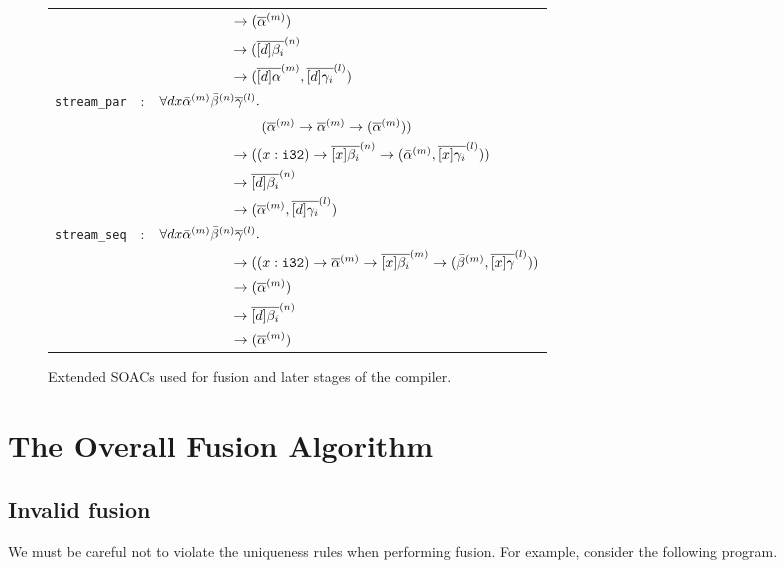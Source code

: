 \begin{figure}[hbt]
\begin{tabular}{lcl}
          & & ~~~~~~~~~~ $\rightarrow (\overline{\alpha}^{(m)})$\\
          & & ~~~~~~~~~~ $\rightarrow (\overline{[d]\beta_i}^{(n)}$\\
          & & ~~~~~~~~~~ $\rightarrow (\overline{[d]\alpha}^{(m)},\overline{[d]\gamma_{i}}^{(l)})$ \\
  {\lstinline!stream_par!} & : & $\forall d x \bar{\alpha}^{(m)}\bar{\beta}^{(n)}\overline{\gamma}^{(l)}.$\\
          & & ~~~~~~~~~~~~~~ $(\overline{\alpha}^{(m)} \rightarrow \overline{\alpha}^{(m)} \rightarrow (\overline{\alpha}^{(m)}))$\\
          & & ~~~~~~~~~~ $\rightarrow ((x: \texttt{i32}) \rightarrow \overline{[x]\beta_i}^{(n)} \rightarrow (\bar{\alpha}^{(m)}, \overline{[x]\gamma_{i}}^{(l)}))$ \\
          & & ~~~~~~~~~~ $\rightarrow \overline{[d]\beta_i}^{(n)}$\\
          & & ~~~~~~~~~~ $\rightarrow (\overline{\alpha}^{(m)},\overline{[d]\gamma_{i}}^{(l)})$ \\
  {\lstinline!stream_seq!} & : & $\forall d x \bar{\alpha}^{(m)}\bar{\beta}^{(n)}\overline{\gamma}^{(l)}.$\\
          & & ~~~~~~~~~~ $\rightarrow ((x: \texttt{i32}) \rightarrow \overline{\alpha}^{(m)} \rightarrow \overline{[x]\beta_i}^{(m)} \rightarrow (\bar{\beta}^{(m)}, \overline{[x]\gamma}^{(l)}))$ \\
          & & ~~~~~~~~~~ $\rightarrow (\overline{\alpha}^{(m)})$\\
          & & ~~~~~~~~~~ $\rightarrow \overline{[d]\beta_i}^{(n)}$\\
          & & ~~~~~~~~~~ $\rightarrow (\overline{\alpha}^{(m)})$ \\

\end{tabular}
\caption{Extended SOACs used for fusion and later stages of the compiler.}
\label{fig:newSoacType}
\end{figure}

\section{The Overall Fusion Algorithm}

\subsection{Invalid fusion}
\label{sec:invalidfusion}

We must be careful not to violate the uniqueness rules when performing
fusion.  For example, consider the following program.


